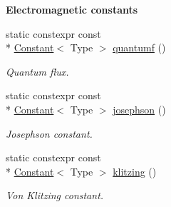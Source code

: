 \begin{Indent}{\bf Electromagnetic constants}
\begin{DoxyCompactItemize}
static constexpr const \\*
\hyperlink{exceptionmagrathea_1_1Constant}{Constant}$<$ Type $>$ \hyperlink{exceptionmagrathea_1_1Constants_a854f2ffe4397b9e767a28b717d46f338}{quantumf} ()
\begin{DoxyCompactList}\small\item\em Quantum flux. \end{DoxyCompactList}\item 
static constexpr const \\*
\hyperlink{exceptionmagrathea_1_1Constant}{Constant}$<$ Type $>$ \hyperlink{exceptionmagrathea_1_1Constants_a657d0035ed85345198afe281168078a6}{josephson} ()
\begin{DoxyCompactList}\small\item\em Josephson constant. \end{DoxyCompactList}\item 
static constexpr const \\*
\hyperlink{exceptionmagrathea_1_1Constant}{Constant}$<$ Type $>$ \hyperlink{exceptionmagrathea_1_1Constants_a6b16da4cf9e5fbc5c9729104a0fe4967}{klitzing} ()
\begin{DoxyCompactList}\small\item\em Von Klitzing constant. \end{DoxyCompactList}\end{DoxyCompactItemize}
\end{Indent}
